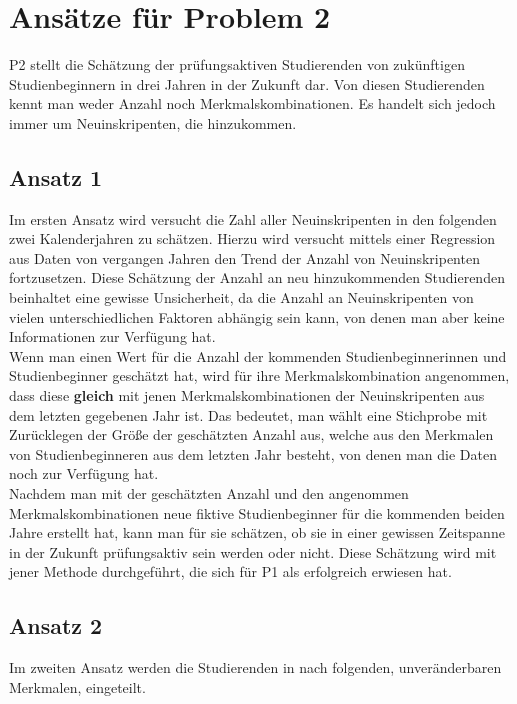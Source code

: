 

\section{Ans\"atze f\"ur Problem 2}
P2 stellt die Sch\"atzung der pr\"ufungsaktiven Studierenden von zuk\"unftigen Studienbeginnern in drei Jahren in der Zukunft dar. Von diesen Studierenden
kennt man weder Anzahl noch Merkmalskombinationen. Es handelt sich jedoch immer um Neuinskripenten, die hinzukommen.

\subsection{Ansatz 1}
Im ersten Ansatz wird versucht die Zahl aller Neuinskripenten in den folgenden zwei Kalenderjahren zu sch\"atzen. Hierzu wird versucht mittels einer Regression aus
Daten von vergangen Jahren den Trend der Anzahl von Neuinskripenten fortzusetzen. Diese Sch\"atzung der Anzahl an neu hinzukommenden Studierenden beinhaltet
eine gewisse Unsicherheit, da die Anzahl an Neuinskripenten von vielen unterschiedlichen Faktoren abh\"angig sein kann, von denen man 
aber keine Informationen zur Verf\"ugung hat. \\

Wenn man einen Wert f\"ur die Anzahl der kommenden Studienbeginnerinnen und Studienbeginner gesch\"atzt hat, wird f\"ur ihre Merkmalskombination angenommen,
dass diese \textbf{gleich} mit jenen Merkmalskombinationen der Neuinskripenten aus dem letzten gegebenen Jahr ist. Das bedeutet, man w\"ahlt eine Stichprobe mit Zur\"ucklegen 
der Gr\"o{\ss}e der gesch\"atzten Anzahl aus, welche aus den Merkmalen von Studienbeginneren aus dem letzten Jahr besteht, von denen man die Daten 
noch zur Verf\"ugung hat. \\

Nachdem man mit der gesch\"atzten Anzahl und den angenommen Merkmalskombinationen neue fiktive Studienbeginner f\"ur die kommenden beiden Jahre erstellt hat, kann man
f\"ur sie sch\"atzen, ob sie in einer gewissen Zeitspanne in der Zukunft pr\"ufungsaktiv sein werden oder nicht. Diese Sch\"atzung wird mit jener Methode durchgef\"uhrt, die
sich f\"ur P1 als erfolgreich erwiesen hat.


\subsection{Ansatz 2}
Im zweiten Ansatz werden die Studierenden in nach folgenden, unver\"anderbaren Merkmalen, eingeteilt.

